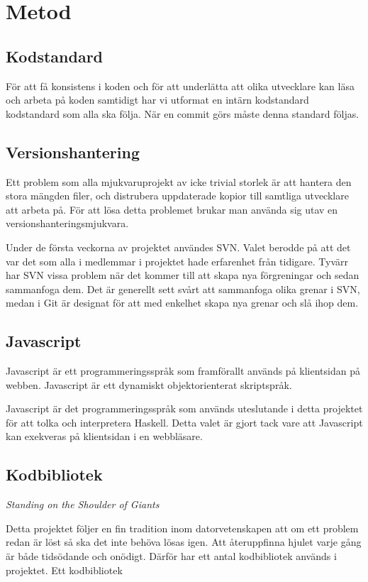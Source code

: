 ﻿\section{Metod} 

\subsection{Kodstandard} 
För att få konsistens i koden och för att underlätta att olika utvecklare kan läsa och arbeta på koden samtidigt har vi utformat en intärn kodstandard kodstandard som alla ska följa.
När en commit görs måste denna standard följas.

\subsection{Versionshantering} 
Ett problem som alla mjukvaruprojekt av icke trivial storlek är att hantera den stora mängden filer, och distrubera uppdaterade kopior till samtliga utvecklare att arbeta på.
För att lösa detta problemet brukar man använda sig utav en versionshanteringsmjukvara. 

Under de första veckorna av projektet användes SVN. Valet berodde på att det var det som alla i medlemmar i projektet hade erfarenhet från tidigare. Tyvärr har SVN vissa problem när det kommer till att skapa nya förgreningar och sedan sammanfoga dem. Det är generellt sett svårt att sammanfoga olika grenar i SVN, medan i Git är designat för att med enkelhet skapa nya grenar och slå ihop dem.   

\subsection{Javascript} 
Javascript \citep{javascript} är ett programmeringsspråk som framförallt används på klientsidan på webben. Javascript är ett dynamiskt objektorienterat skriptspråk.

Javascript är det programmeringsspråk som används uteslutande i detta projektet för att tolka och interpretera Haskell.
Detta valet är gjort tack vare att Javascript kan exekveras på klientsidan i en webbläsare.

\subsection{Kodbibliotek}

\emph{Standing on the Shoulder of Giants}

Detta projektet följer en fin tradition inom datorvetenskapen att om ett problem redan är löst så ska det inte behöva lösas igen. Att återuppfinna hjulet varje gång är både tidsödande och onödigt. 
Därför har ett antal kodbibliotek används i projektet. Ett kodbibliotek

